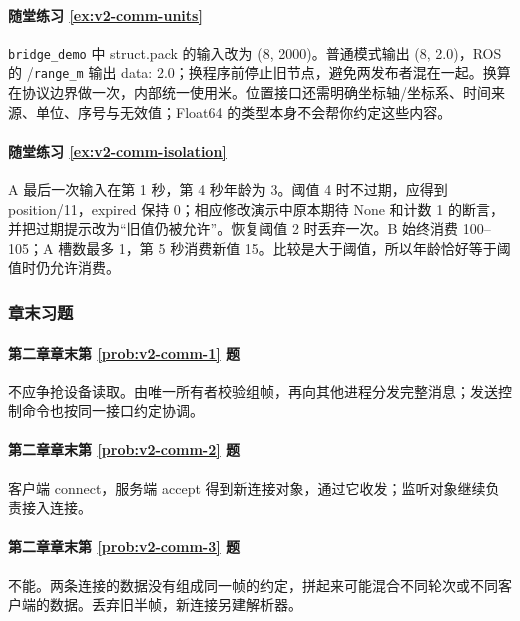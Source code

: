 \paragraph*{随堂练习 \ref{ex:v2-comm-units}}
\begin{solution}
\texttt{bridge\_demo} 中 struct.pack 的输入改为 (8, 2000)。普通模式输出 (8, 2.0)，ROS 的 /\texttt{range\_m} 输出 data: 2.0；换程序前停止旧节点，避免两发布者混在一起。换算在协议边界做一次，内部统一使用米。位置接口还需明确坐标轴/坐标系、时间来源、单位、序号与无效值；Float64 的类型本身不会帮你约定这些内容。
\end{solution}

\paragraph*{随堂练习 \ref{ex:v2-comm-isolation}}
\begin{solution}
A 最后一次输入在第 1 秒，第 4 秒年龄为 3。阈值 4 时不过期，应得到 position/11，expired 保持 0；相应修改演示中原本期待 None 和计数 1 的断言，并把过期提示改为“旧值仍被允许”。恢复阈值 2 时丢弃一次。B 始终消费 100--105；A 槽数最多 1，第 5 秒消费新值 15。比较是大于阈值，所以年龄恰好等于阈值时仍允许消费。
\end{solution}

\subsubsection*{章末习题}
\paragraph*{第二章章末第 \ref{prob:v2-comm-1} 题}
\begin{solution}
不应争抢设备读取。由唯一所有者校验组帧，再向其他进程分发完整消息；发送控制命令也按同一接口约定协调。
\end{solution}
\paragraph*{第二章章末第 \ref{prob:v2-comm-2} 题}
\begin{solution}
客户端 connect，服务端 accept 得到新连接对象，通过它收发；监听对象继续负责接入连接。
\end{solution}
\paragraph*{第二章章末第 \ref{prob:v2-comm-3} 题}
\begin{solution}
不能。两条连接的数据没有组成同一帧的约定，拼起来可能混合不同轮次或不同客户端的数据。丢弃旧半帧，新连接另建解析器。
\end{solution}
